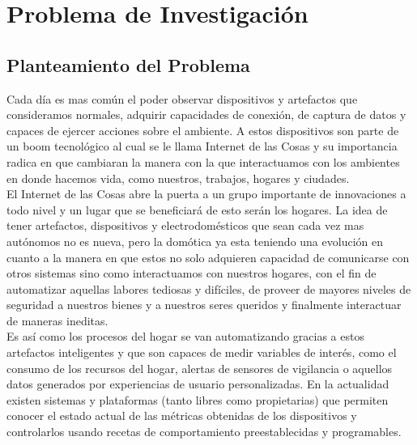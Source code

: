 

\chapter{Problema de Investigación}

\section{Planteamiento del Problema}
Cada día es mas común el poder observar dispositivos y artefactos que consideramos normales, adquirir capacidades de conexión, de captura de datos y capaces de ejercer acciones sobre el ambiente. A estos dispositivos son parte de un boom tecnológico al cual se le llama Internet de las Cosas y su importancia radica en que cambiaran la manera con la que interactuamos con los ambientes en donde hacemos vida, como nuestros, trabajos, hogares y ciudades.\\

El Internet de las Cosas abre la puerta a un grupo importante de innovaciones a todo nivel y un lugar que se beneficiará de esto serán los hogares.  La idea de tener artefactos, dispositivos y electrodomésticos que sean cada vez mas autónomos no es nueva, pero la domótica ya esta teniendo una evolución en cuanto a la manera en que estos no solo adquieren capacidad de comunicarse con otros sistemas sino como interactuamos con nuestros hogares, con el fin de automatizar aquellas labores tediosas y difíciles, de proveer de mayores niveles de seguridad a nuestros bienes y a nuestros seres queridos y finalmente interactuar de maneras ineditas.\\

Es así como los procesos del hogar se van automatizando gracias a estos artefactos inteligentes y que son capaces de medir variables de interés, como el consumo de los recursos del hogar, alertas de sensores de vigilancia o aquellos datos generados por experiencias de usuario personalizadas. En la actualidad existen sistemas y plataformas (tanto libres como propietarias) que permiten conocer el estado actual de las métricas obtenidas de los dispositivos y controlarlos usando recetas de comportamiento preestablecidas y programables.\\ 


